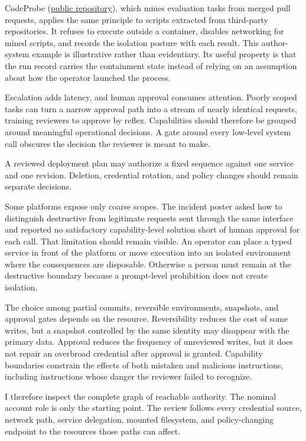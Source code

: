 CodeProbe (\href{https://github.com/sjarmak/codeprobe}{public repository}), which mines evaluation tasks from merged pull requests, applies the same principle to scripts extracted from third-party repositories. It refuses to execute outside a container, disables networking for mined scripts, and records the isolation posture with each result. This author-system example is illustrative rather than evidentiary. Its useful property is that the run record carries the containment state instead of relying on an assumption about how the operator launched the process.

Escalation adds latency, and human approval consumes attention. Poorly scoped tasks can turn a narrow approval path into a stream of nearly identical requests, training reviewers to approve by reflex. Capabilities should therefore be grouped around meaningful operational decisions. A gate around every low-level system call obscures the decision the reviewer is meant to make.

A reviewed deployment plan may authorize a fixed sequence against one service and one revision. Deletion, credential rotation, and policy changes should remain separate decisions.

Some platforms expose only coarse scopes. The incident poster asked how to distinguish destructive from legitimate requests sent through the same interface and reported no satisfactory capability-level solution short of human approval for each call. That limitation should remain visible. An operator can place a typed service in front of the platform or move execution into an isolated environment where the consequences are disposable. Otherwise a person must remain at the destructive boundary because a prompt-level prohibition does not create isolation.

The choice among partial commits, reversible environments, snapshots, and approval gates depends on the resource. Reversibility reduces the cost of some writes, but a snapshot controlled by the same identity may disappear with the primary data. Approval reduces the frequency of unreviewed writes, but it does not repair an overbroad credential after approval is granted. Capability boundaries constrain the effects of both mistaken and malicious instructions, including instructions whose danger the reviewer failed to recognize.

I therefore inspect the complete graph of reachable authority. The nominal account role is only the starting point. The review follows every credential source, network path, service delegation, mounted filesystem, and policy-changing endpoint to the resources those paths can affect.

